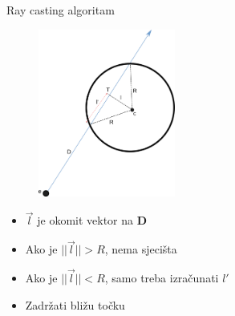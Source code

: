 \documentclass[9pt]{beamer}
\begin{document}
\begin{frame}{Ray casting algoritam}
\begin{figure}
	\includegraphics[width=0.4\textwidth]{./slike/sjeciste_kugla.png}
\end{figure}
\begin{itemize}
	\item $\vec{l}$ je okomit vektor na $\textbf{D}$
	\item Ako je $||\vec{l}|| > R$, nema sjecišta
	\item Ako je $||\vec{l}|| < R$, samo treba izračunati $l'$
	\item Zadržati bližu točku
\end{itemize}
\end{frame}
\end{document}
